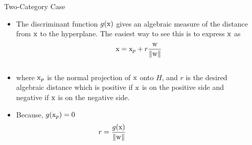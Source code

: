 \begin{frame}{Two-Category Case}
\begin{itemize}
\item The discriminant function $g({\rm x})$ gives an algebraic measure of the distance from $\rm x$ to the hyperplane. The easiest way to see this is to express ${\rm x}$ as
\begin{equation}
{\rm x} = {{\rm x}_p} + r\frac{{\rm w}}{{\left\| {\rm w} \right\|}} \nonumber
\end{equation}
\end{itemize}
\begin{columns}
\begin{column}{8.5cm}
\begin{itemize}
\item where ${\rm x}_p$ is the normal projection of ${\rm x}$ onto $H$, and $r$ is the desired algebraic distance which is positive if ${\rm x}$ is on the positive side and negative if ${\rm x}$ is on the negative side.
\item Because, $g({\rm x}_p)=0$
\begin{equation}
r = \frac{{g({\rm x})}}{{\left\| {\rm w} \right\|}}~~~~~~~~~~~~~~~~~~ \nonumber
\end{equation}
\end{itemize}
\end{column}
\begin{column}{4.5cm}
\end{column}
\end{columns}
\end{frame}

